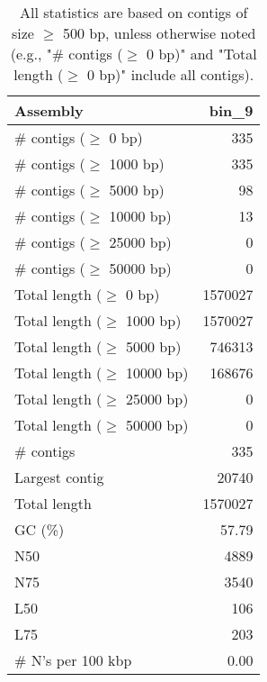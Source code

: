 \documentclass[12pt,a4paper]{article}
\begin{document}
\begin{table}[ht]
\begin{center}
\caption{All statistics are based on contigs of size $\geq$ 500 bp, unless otherwise noted (e.g., "\# contigs ($\geq$ 0 bp)" and "Total length ($\geq$ 0 bp)" include all contigs).}
\begin{tabular}{|l*{1}{|r}|}
\hline
Assembly & bin\_9 \\ \hline
\# contigs ($\geq$ 0 bp) & 335 \\ \hline
\# contigs ($\geq$ 1000 bp) & 335 \\ \hline
\# contigs ($\geq$ 5000 bp) & 98 \\ \hline
\# contigs ($\geq$ 10000 bp) & 13 \\ \hline
\# contigs ($\geq$ 25000 bp) & 0 \\ \hline
\# contigs ($\geq$ 50000 bp) & 0 \\ \hline
Total length ($\geq$ 0 bp) & 1570027 \\ \hline
Total length ($\geq$ 1000 bp) & 1570027 \\ \hline
Total length ($\geq$ 5000 bp) & 746313 \\ \hline
Total length ($\geq$ 10000 bp) & 168676 \\ \hline
Total length ($\geq$ 25000 bp) & 0 \\ \hline
Total length ($\geq$ 50000 bp) & 0 \\ \hline
\# contigs & 335 \\ \hline
Largest contig & 20740 \\ \hline
Total length & 1570027 \\ \hline
GC (\%) & 57.79 \\ \hline
N50 & 4889 \\ \hline
N75 & 3540 \\ \hline
L50 & 106 \\ \hline
L75 & 203 \\ \hline
\# N's per 100 kbp & 0.00 \\ \hline
\end{tabular}
\end{center}
\end{table}
\end{document}
